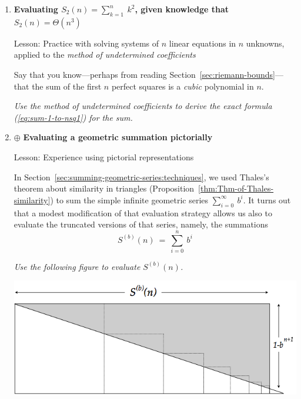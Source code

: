 \begin{enumerate}
{\em Show how to use this machine in order to compute the sum of the first $n$ integers.}

\smallskip

{\em Hint.}
Try to think creatively.  Think of how one can (mathematically) relate the first $n$ integers to their squares.
\medskip

\medskip\item
{\bf Evaluating $S_2(n) = \sum_{k=1}^n \ k^2$, given knowledge that $S_2(n) = \Theta(n^3)$}

{\sc Lesson:} Practice with solving systems of $n$ linear equations in $n$ unknowns, applied to the {\it method of undetermined coefficients}


\smallskip

Say that you know---perhaps from reading Section~\ref{sec:riemann-bounds}---that the sum of the first $n$ perfect squares is a {\em cubic} polynomial in $n$.

\smallskip

{\em Use the method of undetermined coefficients to derive the exact formula (\ref{eq:sum-1-to-nsq1}) for the sum.}

\medskip\item
$\oplus$
{\bf Evaluating a geometric summation pictorially}

{\sc Lesson:} Experience using pictorial representations

\smallskip

In Section~\ref{sec:summing-geometric-series:techniques}, we used Thales's theorem about similarity in triangles (Proposition~\ref{thm:Thm-of-Thales-similarity}) to sum the simple infinite geometric series $\sum_{i=0}^\infty \ b^i$.  It turns out that a modest modification of that evaluation strategy allows us also to evaluate the truncated versions of that series, namely, the summations
\[ S^{(b)}(n) \ = \ \sum_{i=0}^n \ b^i \]

{\em Use the following figure to evaluate $S^{(b)}(n)$.}

\centerline{\includegraphics[scale=0.4]{FiguresArithmetic/ThalesGeometricSumFinite}}


\end{enumerate}
